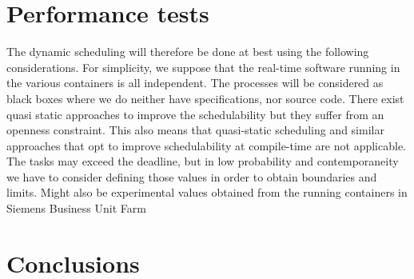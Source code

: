 \documentclass[]{scrartcl}
\begin{document}
%
%
%
%
%
%

\section{Performance tests}
\label{sec:perftest}


The dynamic scheduling will therefore be done at best using the following considerations.
For simplicity, we suppose that the real-time software running in the various containers is all independent. 
The processes will be considered as black boxes where we do neither have specifications, nor  source code. 
There exist quasi static approaches to improve the schedulability but they suffer from an openness constraint.
This also means that quasi-static scheduling and similar approaches that opt to improve schedulability at compile-time are not applicable.
The tasks may exceed the deadline, but in low probability and contemporaneity
we have to consider defining those values in order to obtain boundaries and limits. Might also be experimental values obtained from the running containers in Siemens Business Unit Farm


\lipsum[3]

\section{Conclusions}
\label{sec:conclusions}

\lipsum[1]


\end{document}
